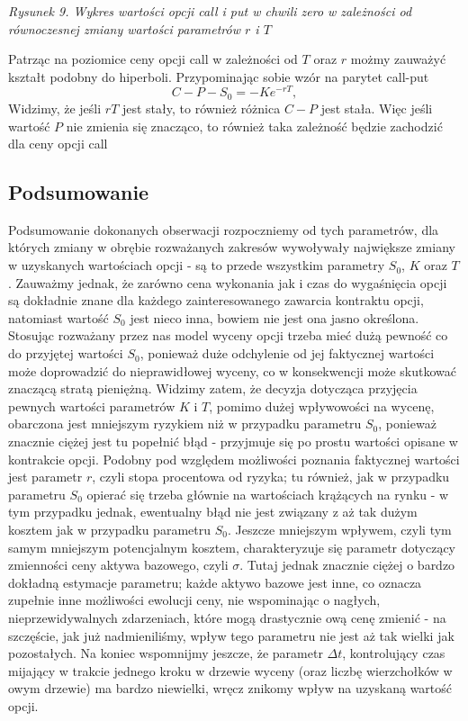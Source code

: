 \documentclass[
]{article}
\begin{document}
\emph{Rysunek 9. Wykres wartości opcji call i put w chwili zero w
zależności od równoczesnej zmiany wartości parametrów \(r\) i \(T\)}

Patrząc na poziomice ceny opcji call w zależności od \(T\) oraz \(r\)
możmy zauważyć kształt podobny do hiperboli. Przypominając sobie wzór na
parytet call-put \[C-P-S_0 = -Ke^{-rT},\] Widzimy, że jeśli \(rT\) jest
stały, to również różnica \(C-P\) jest stała. Więc jeśli wartość \(P\)
nie zmienia się znacząco, to również taka zależność będzie zachodzić dla
ceny opcji call

\hypertarget{podsumowanie}{%
\subsection{Podsumowanie}\label{podsumowanie}}

Podsumowanie dokonanych obserwacji rozpoczniemy od tych parametrów, dla
których zmiany w obrębie rozważanych zakresów wywoływały największe
zmiany w uzyskanych wartościach opcji - są to przede wszystkim parametry
\(S_0\), \(K\) oraz \(T\). Zauważmy jednak, że zarówno cena wykonania
jak i czas do wygaśnięcia opcji są dokładnie znane dla każdego
zainteresowanego zawarcia kontraktu opcji, natomiast wartość \(S_0\)
jest nieco inna, bowiem nie jest ona jasno określona. Stosując rozważany
przez nas model wyceny opcji trzeba mieć dużą pewność co do przyjętej
wartości \(S_0\), ponieważ duże odchylenie od jej faktycznej wartości
może doprowadzić do nieprawidłowej wyceny, co w konsekwencji może
skutkować znaczącą stratą pieniężną. Widzimy zatem, że decyzja dotycząca
przyjęcia pewnych wartości parametrów \(K\) i \(T\), pomimo dużej
wpływowości na wycenę, obarczona jest mniejszym ryzykiem niż w przypadku
parametru \(S_0\), ponieważ znacznie ciężej jest tu popełnić błąd -
przyjmuje się po prostu wartości opisane w kontrakcie opcji. Podobny pod
względem możliwości poznania faktycznej wartości jest parametr \(r\),
czyli stopa procentowa od ryzyka; tu również, jak w przypadku parametru
\(S_0\) opierać się trzeba głównie na wartościach krążących na rynku - w
tym przypadku jednak, ewentualny błąd nie jest związany z aż tak dużym
kosztem jak w przypadku parametru \(S_0\). Jeszcze mniejszym wpływem,
czyli tym samym mniejszym potencjalnym kosztem, charakteryzuje się
parametr dotyczący zmienności ceny aktywa bazowego, czyli \(\sigma\).
Tutaj jednak znacznie ciężej o bardzo dokładną estymacje parametru;
każde aktywo bazowe jest inne, co oznacza zupełnie inne możliwości
ewolucji ceny, nie wspominając o nagłych, nieprzewidywalnych
zdarzeniach, które mogą drastycznie ową cenę zmienić - na szczęście, jak
już nadmieniliśmy, wpływ tego parametru nie jest aż tak wielki jak
pozostałych. Na koniec wspomnijmy jeszcze, że parametr \(\Delta t\),
kontrolujący czas mijający w trakcie jednego kroku w drzewie wyceny
(oraz liczbę wierzchołków w owym drzewie) ma bardzo niewielki, wręcz
znikomy wpływ na uzyskaną wartość opcji.
\end{document}
